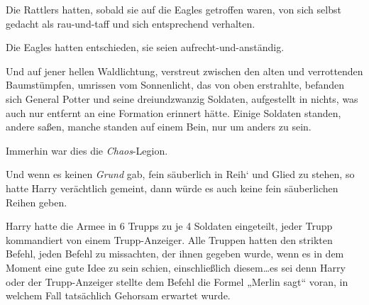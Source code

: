 Die Rattlers hatten, sobald sie auf die Eagles getroffen waren, von sich selbst gedacht als rau-und-taff und sich entsprechend verhalten.

Die Eagles hatten entschieden, sie seien aufrecht-und-anständig.

Und auf jener hellen Waldlichtung, verstreut zwischen den alten und verrottenden Baumstümpfen, umrissen vom Sonnenlicht, das von oben erstrahlte, befanden sich General Potter und seine dreiundzwanzig Soldaten, aufgestellt in nichts, was auch nur entfernt an eine Formation erinnert hätte. Einige Soldaten standen, andere saßen, manche standen auf einem Bein, nur um anders zu sein.

Immerhin war dies die \emph{Chaos}-Legion.

Und wenn es keinen \emph{Grund} gab, fein säuberlich in Reih` und Glied zu stehen, so hatte Harry verächtlich gemeint, dann würde es auch keine fein säuberlichen Reihen geben.

Harry hatte die Armee in 6 Trupps zu je 4 Soldaten eingeteilt, jeder Trupp kommandiert von einem Trupp-Anzeiger. Alle Truppen hatten den strikten Befehl, jeden Befehl zu missachten, der ihnen gegeben wurde, wenn es in dem Moment eine gute Idee zu sein schien, einschließlich diesem…es sei denn Harry oder der Trupp-Anzeiger stellte dem Befehl die Formel „Merlin sagt“ voran, in welchem Fall tatsächlich Gehorsam erwartet wurde.%

